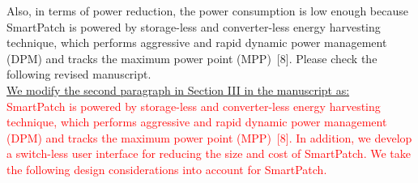\documentclass[onecolumn]{IEEEconf}
\begin{document}
\begin{description}
Also, in terms of power reduction, the power consumption is low enough because SmartPatch is powered by storage-less and converter-less energy harvesting technique, which performs aggressive and rapid dynamic power management (DPM) and tracks the maximum power point (MPP)~[8]. Please check the following revised manuscript. \\

\underline{We modify the second paragraph in Section III in the manuscript as:}\\
\textcolor{red}{SmartPatch is powered by storage-less and converter-less energy harvesting technique, which performs aggressive and rapid dynamic power management (DPM) and tracks the maximum power point (MPP)~[8]. In addition, we develop a switch-less user interface for reducing the size and cost of SmartPatch. We take the following design considerations into account for SmartPatch.}
\end{description}
\end{document}
